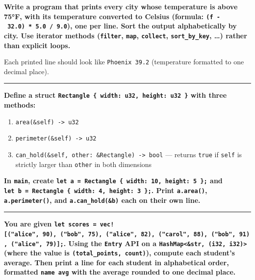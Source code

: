 \documentclass[
  11pt,
]{article}
\newenvironment{Shaded}{}{}
\providecommand{\tightlist}{%
  \setlength{\itemsep}{0pt}\setlength{\parskip}{0pt}}
\begin{document}
\textbf{Write a program that prints every city whose temperature is
above 75°F, with its temperature converted to Celsius (formula:
\texttt{(f\ -\ 32.0)\ *\ 5.0\ /\ 9.0}), one per line. Sort the output
alphabetically by city. Use iterator methods (\texttt{filter},
\texttt{map}, \texttt{collect}, \texttt{sort\_by\_key}, \ldots) rather
than explicit loops.}

Each printed line should look like \texttt{Phoenix\ 39.2} (temperature
formatted to one decimal place).

\begin{Shaded}
\begin{Highlighting}[]


\end{Highlighting}
\end{Shaded}

\begin{center}\rule{0.5\linewidth}{0.5pt}\end{center}

\textbf{Define a struct
\texttt{Rectangle\ \{\ width:\ u32,\ height:\ u32\ \}} with three
methods:}

\begin{enumerate}
\def\labelenumi{\arabic{enumi}.}
\tightlist
\item
  \texttt{area(\&self)\ -\textgreater{}\ u32}
\item
  \texttt{perimeter(\&self)\ -\textgreater{}\ u32}
\item
  \texttt{can\_hold(\&self,\ other:\ \&Rectangle)\ -\textgreater{}\ bool}
  --- returns \texttt{true} if \texttt{self} is strictly larger than
  \texttt{other} in both dimensions
\end{enumerate}

\textbf{In \texttt{main}, create
\texttt{let\ a\ =\ Rectangle\ \{\ width:\ 10,\ height:\ 5\ \};} and
\texttt{let\ b\ =\ Rectangle\ \{\ width:\ 4,\ height:\ 3\ \};}. Print
\texttt{a.area()}, \texttt{a.perimeter()}, and \texttt{a.can\_hold(\&b)}
each on their own line.}

\begin{Shaded}
\begin{Highlighting}[]


\end{Highlighting}
\end{Shaded}

\begin{center}\rule{0.5\linewidth}{0.5pt}\end{center}

\textbf{You are given
\texttt{let\ scores\ =\ vec!{[}("alice",\ 90),\ ("bob",\ 75),\ ("alice",\ 82),\ ("carol",\ 88),\ ("bob",\ 91),\ ("alice",\ 79){]};}.
Using the \texttt{Entry} API on a
\texttt{HashMap\textless{}\&str,\ (i32,\ i32)\textgreater{}} (where the
value is \texttt{(total\_points,\ count)}), compute each student's
average. Then print a line for each student in alphabetical order,
formatted \texttt{name\ avg} with the average rounded to one decimal
place.}
\end{document}
